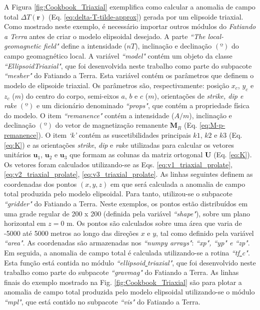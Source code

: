 A Figura \ref{fig:Cookbook_Triaxial} exemplifica como calcular a anomalia de campo total $\Delta T (\mathbf{r})$ (Eq. \ref{eq:delta-T-tilde-approx}) gerada por um elipsoide triaxial.
Como mostrado neste exemplo, é necessário importar outros módulos do \textit{Fatiando a Terra} antes de criar o modelo elipsoidal desejado.
A parte \textit{``The local-geomagnetic field"} define a intensidade ($nT$), inclinação e declinação $(º)$ do campo geomagnético local.
A variável \textit{``model"} contém um objeto da classe \textit{``EllipsoidTriaxial"}, que foi desenvolvida neste trabalho como parte do subpacote \textit{``mesher"} do Fatiando a Terra. Esta variável contém os parâmetros que definem o modelo de elipsoide triaxial. Os parâmetros são, respectivamente: posição $x_c$, $y_c$ e $z_c$ ($m$) do centro do corpo, semi-eixos $a$, $b$ e $c$ ($m$), orientações de \textit{strike, dip e rake} $(º)$ e um dicionário denominado \textit{``props"}, que contém a propriedade física do  modelo. O item \textit{``remanence"} contém a intensidade ($A/m$), inclinação e declinação $(º)$ do vetor de magnetização remanente $\mathbf{M}_{R}$ (Eq. \ref{eq:M-p-remanence}). O item \textit{`k'} contém as suscetibilidades principais $k1$, $k2$ e $k3$ (Eq. \ref{eq:K}) e as orientações \textit{strike}, \textit{dip} e \textit{rake} utilizadas para calcular os vetores unitários $\mathbf{u}_{1}$, $\mathbf{u}_{2}$ e $\mathbf{u}_{3}$ que formam as colunas da matriz ortogonal $\mathbf{U}$ (Eq. \ref{eq:K}). Os vetores foram calculados utilizando-se as Eqs. \ref{eq:v1_triaxial_prolate},
\ref{eq:v2_triaxial_prolate}, \ref{eq:v3_triaxial_prolate}.
As linhas seguintes definem as coordenadas dos pontos $(x, y, z)$ em que será calculada a anomalia de campo total produzida pelo modelo elipsoidal.
Para tanto, utilizou-se o subpacote \textit{``gridder"} do Fatiando a Terra. Neste exemplos, os pontos estão distribuídos em uma grade regular de 200 x 200 (definida pela variável \textit{``shape"}), sobre um plano horizontal em $z = 0$ m. Os pontos são calculados sobre uma área que varia de -5000 até 5000 metros ao longo das direções $x$ e $y$, tal como definido pela variável \textit{``area"}.
As coordenadas são armazenadas nos \textit{``numpy arrays"}: \textit{``xp", ``yp" e ``zp"}. Em seguida, a anomalia de campo total é calculada utilizando-se a rotina \textit{``tf\underline{ }c"}. Esta função está contida no módulo \textit{``ellipsoid\underline{ }triaxial"}, que foi desenvolvido neste trabalho como parte do subpacote \textit{``gravmag"} do Fatiando a Terra. As linhas finais do exemplo mostrado na Fig. \ref{fig:Cookbook_Triaxial} são para plotar a anomalia de campo total produzida pelo modelo elipsoidal utilizando-se o módulo \textit{``mpl"}, que está contido no subpacote \textit{``vis"} do Fatiando a Terra.

